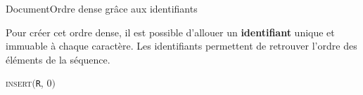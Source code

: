 \begin{frame}{Document}{Ordre dense grâce aux identifiants}

  Pour créer cet ordre dense, il est possible d'allouer un \textbf{identifiant}
  unique et immuable à chaque caractère. Les
  identifiants permettent de retrouver l'ordre des éléments de la séquence.
  
  \vspace{1cm}
  
  \begin{center}
  \textsc{insert}$($\texttt{R}, $0)$   \\
  \end{center}

  \vspace{1cm}

  \begin{center}
    
  \end{center}

\end{frame}



  
  

